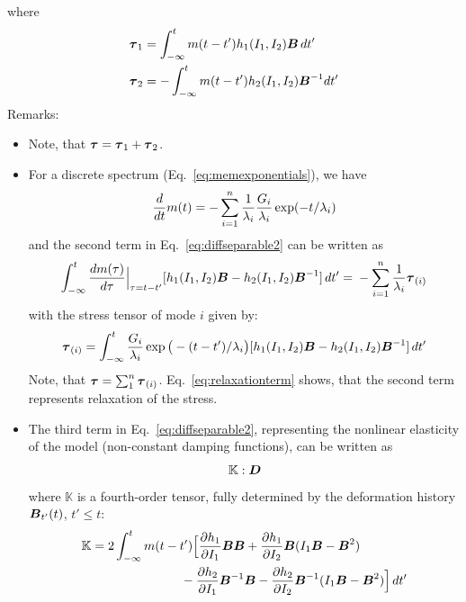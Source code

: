 where 
\begin{align}
  \boldsymbol{\tau}_1&=\int_{-\infty}^tm(t-t')h_1(I_1,I_2)\boldsymbol{B}\,dt'\\
   \boldsymbol{\tau}_2&=-\int_{-\infty}^tm(t-t')h_2(I_1,I_2)\boldsymbol{B}^{-1}dt'
\end{align}
Remarks:
\begin{itemize}
\item Note, that  $\boldsymbol{\tau}=\boldsymbol{\tau}_1+\boldsymbol{\tau}_2$.
\item For a discrete spectrum (Eq.~\eqref{eq:memexponentials}), we have
\begin{equation}
   \dfrac{d }{d t}m(t)=
   -\sum_{i=1}^n \frac1{\lambda_i}\frac{G_i}{\lambda_i}\exp(-t/\lambda_i)
   \label{eq:divmemexponentials}
\end{equation}
and the second term in Eq.~\eqref{eq:diffseparable2} can be written as
\begin{equation}
 \int_{-\infty}^t\dfrac{d m(\tau)}{d \tau}\Big|_{\tau=t-t'}[h_1(I_1,I_2)\boldsymbol{B}-h_2(I_1,I_2)\boldsymbol{B}^{-1}]\,dt'=\\
  -\sum_{i=1}^n \frac1{\lambda_i} \boldsymbol{\tau}_{(i)}
  \label{eq:relaxationterm}
\end{equation}
with the stress tensor of mode $i$ given by:
\begin{equation}
 \boldsymbol{\tau}_{(i)}=\int_{-\infty}^t\frac{G_i}{\lambda_i}\exp\big(-(t-t')/\lambda_i\big)[h_1(I_1,I_2)\boldsymbol{B}-h_2(I_1,I_2)\boldsymbol{B}^{-1}]\,dt'
\end{equation}
Note, that $\boldsymbol{\tau}=\sum_1^n\boldsymbol{\tau}_{(i)}$. Eq.~\eqref{eq:relaxationterm} shows, that the second term represents relaxation of the stress.
\item The third term in Eq.~\eqref{eq:diffseparable2}, representing the nonlinear elasticity of the model (non-constant damping functions), can be written as
\begin{equation}
      \mathbb{K}:\boldsymbol{D}
\end{equation}
where $\mathbb K$ is a fourth-order tensor, fully determined by the deformation history $\boldsymbol{B}_{t'}(t)$, $t'\leq t$:
\begin{equation}
\begin{split}
    \mathbb K &= 2\int_{-\infty}^tm(t-t')\Big[\dfrac{\partial h_1}{\partial I_1}\boldsymbol{B}\boldsymbol{B}+\dfrac{\partial h_1}{\partial I_2}\boldsymbol{B}(I_1\boldsymbol{B}-\boldsymbol{B}^2)\\
  &\hspace*{2.5cm}-\dfrac{\partial h_2}{\partial I_1}\boldsymbol{B}^{-1}\boldsymbol{B}-\dfrac{\partial h_2}{\partial I_2}\boldsymbol{B}^{-1}(I_1\boldsymbol{B}-\boldsymbol{B}^2)\Big]\,dt'
\end{split}
\end{equation}

\end{itemize}
